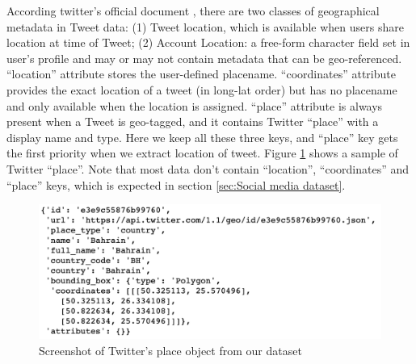According twitter's official document \cite{twitter_dev}, there are two classes of geographical metadata in Tweet data: (1) Tweet location, which is available when users share location at time of Tweet; (2) Account Location: a free-form character field set in user's profile and may or may not contain metadata that can be geo-referenced. ``location'' attribute stores the user-defined placename. ``coordinates'' attribute provides the exact location of a tweet (in long-lat order) but has no placename and only available when the location is assigned. ``place'' attribute is always present when a Tweet is geo-tagged, and it contains Twitter ``place'' with a display name and type. Here we keep all these three keys, and ``place'' key gets the first priority when we extract location of tweet. Figure \ref{fig:twitter_place} shows a sample of Twitter ``place''. Note that most data don't contain ``location'', ``coordinates'' and ``place'' keys, which is expected in section \ref{sec:Social media dataset}.
\begin{figure}[!htbp]
    \centering
    \includegraphics[width=5in]{images/twitter_place.png}
    \caption{Screenshot of Twitter's place object from our dataset}
    \label{fig:twitter_place}
\end{figure}

